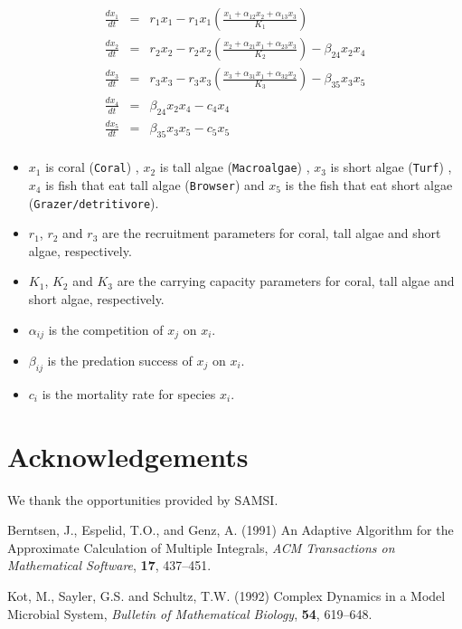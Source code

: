 \documentclass[11pt,twoside]{article}
\numberwithin{equation}{section}
\begin{document}
\begin{eqnarray*}
\frac{d x_1}{dt} &=& r_1 x_1 - r_1 x_1 \left( \frac{ x_1 + \alpha_{12} x_2 + \alpha_{13} x_3}{K_1} \right)  \\
\frac{d x_2}{dt} &=& r_2 x_2 - r_2 x_2 \left( \frac{ x_2 + \alpha_{21} x_1 + \alpha_{23} x_3}{K_2} \right) - \beta_{24} x_2 x_4  \\
\frac{d x_3}{dt} &=& r_3 x_3 - r_3 x_3 \left( \frac{ x_3 + \alpha_{31} x_1 + \alpha_{32} x_2}{K_3} \right) - \beta_{35} x_3 x_5   \\
\frac{d x_4}{dt} &=& \beta_{24} x_2 x_4  - c_4 x_4 \\
\frac{d x_5}{dt} &=& \beta_{35} x_3 x_5  - c_5 x_5 \\
\end{eqnarray*}
\begin{itemize}
  \item $x_1$ is coral (\verb,Coral,) , $x_2$ is tall algae (\verb,Macroalgae,) , $x_3$ is short algae (\verb,Turf,) , $x_4$ is fish that eat tall algae (\verb,Browser,) and $x_5$ is the fish that eat short algae (\verb,Grazer/detritivore,).  
  \item $r_1$, $r_2$ and $r_3$ are the recruitment parameters for coral, tall algae and short algae, respectively.
  \item $K_1$, $K_2$ and $K_3$ are the carrying capacity parameters for coral, tall algae and short algae, respectively.
  \item $\alpha_{ij}$ is the competition of $x_j$ on $x_i$.
  \item $\beta_{ij}$ is the predation success of $x_j$ on $x_i$.
  \item $c_i$ is the mortality rate for species $x_i$.
\end{itemize}
\section*{Acknowledgements}
We thank the opportunities provided by SAMSI. 

\begin{thebibliography}{}
Berntsen, J., Espelid, T.O., and Genz, A. (1991) An Adaptive Algorithm for the Approximate Calculation 
of Multiple Integrals, {\it ACM Transactions on Mathematical Software}, {\bf 17}, 437--451.

Kot, M., Sayler, G.S. and Schultz, T.W. (1992) Complex Dynamics in a Model Microbial System, {\it Bulletin of Mathematical Biology}, {\bf 54}, 619--648.
\end{thebibliography}
\end{document}
